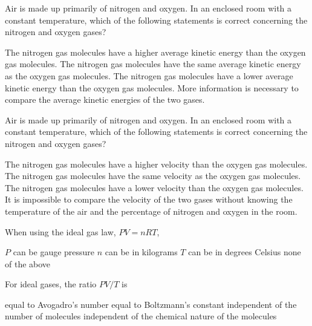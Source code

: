 \documentclass{../../oss-apphys-exam}
\begin{document}


\begin{questions}
  \classkickMCinstructions
  
  \question Air is made up primarily of nitrogen and oxygen. In an enclosed room
  with a constant temperature, which of the following statements is
  correct concerning the nitrogen and oxygen gases?
  \begin{choices}
    \choice The nitrogen gas molecules have a higher average kinetic energy than
    the oxygen gas molecules.
    \choice The nitrogen gas molecules have the same average kinetic energy as
    the oxygen gas molecules.
    \choice The nitrogen gas molecules have a lower average kinetic energy than
    the oxygen gas molecules.
    \choice More information is necessary to compare the average kinetic
    energies of the two gases.
  \end{choices}
  
  \question Air is made up primarily of nitrogen and oxygen. In an enclosed room
  with a constant temperature, which of the following statements is correct
  concerning the nitrogen and oxygen gases?
  \begin{choices}
    \choice The nitrogen gas molecules have a higher velocity than the oxygen
    gas molecules.
    \choice The nitrogen gas molecules have the same velocity as the oxygen gas
    molecules.
    \choice The nitrogen gas molecules have a lower velocity than the oxygen gas
    molecules.
    \choice It is impossible to compare the velocity of the two gases without
    knowing the temperature of the air and the percentage of nitrogen and
    oxygen in the room.
  \end{choices}
    
  \question When using the ideal gas law, $PV=nRT$,
  \begin{choices}
    \choice $P$ can be gauge pressure
    \choice $n$ can be in kilograms
    \choice $T$ can be in degrees Celsius
    \choice none of the above
  \end{choices}

  \question For ideal gases, the ratio $PV/T$ is
  \begin{choices}
    \choice equal to Avogadro's number
    \choice equal to Boltzmann's constant
    \choice independent of the number of molecules
    \choice independent of the chemical nature of the molecules
  \end{choices}


\end{questions}
\end{document}
